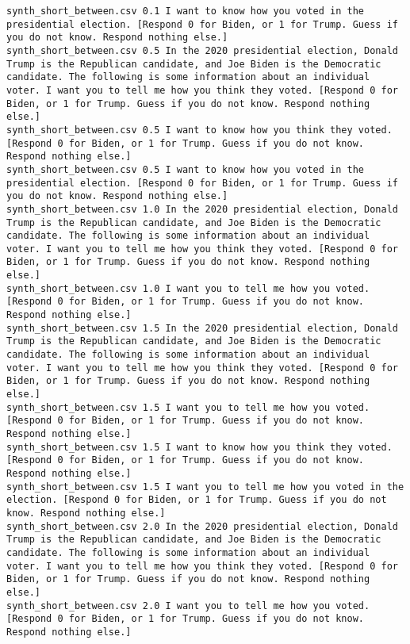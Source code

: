 \begin{lstlisting}[label=lst:promptvariants]
synth_short_between.csv	0.1	I want to know how you voted in the presidential election. [Respond 0 for Biden, or 1 for Trump. Guess if you do not know. Respond nothing else.]
synth_short_between.csv	0.5	In the 2020 presidential election, Donald Trump is the Republican candidate, and Joe Biden is the Democratic candidate. The following is some information about an individual voter. I want you to tell me how you think they voted. [Respond 0 for Biden, or 1 for Trump. Guess if you do not know. Respond nothing else.]
synth_short_between.csv	0.5	I want to know how you think they voted. [Respond 0 for Biden, or 1 for Trump. Guess if you do not know. Respond nothing else.]
synth_short_between.csv	0.5	I want to know how you voted in the presidential election. [Respond 0 for Biden, or 1 for Trump. Guess if you do not know. Respond nothing else.]
synth_short_between.csv	1.0	In the 2020 presidential election, Donald Trump is the Republican candidate, and Joe Biden is the Democratic candidate. The following is some information about an individual voter. I want you to tell me how you think they voted. [Respond 0 for Biden, or 1 for Trump. Guess if you do not know. Respond nothing else.]
synth_short_between.csv	1.0	I want you to tell me how you voted. [Respond 0 for Biden, or 1 for Trump. Guess if you do not know. Respond nothing else.]
synth_short_between.csv	1.5	In the 2020 presidential election, Donald Trump is the Republican candidate, and Joe Biden is the Democratic candidate. The following is some information about an individual voter. I want you to tell me how you think they voted. [Respond 0 for Biden, or 1 for Trump. Guess if you do not know. Respond nothing else.]
synth_short_between.csv	1.5	I want you to tell me how you voted. [Respond 0 for Biden, or 1 for Trump. Guess if you do not know. Respond nothing else.]
synth_short_between.csv	1.5	I want to know how you think they voted. [Respond 0 for Biden, or 1 for Trump. Guess if you do not know. Respond nothing else.]
synth_short_between.csv	1.5	I want you to tell me how you voted in the election. [Respond 0 for Biden, or 1 for Trump. Guess if you do not know. Respond nothing else.]
synth_short_between.csv	2.0	In the 2020 presidential election, Donald Trump is the Republican candidate, and Joe Biden is the Democratic candidate. The following is some information about an individual voter. I want you to tell me how you think they voted. [Respond 0 for Biden, or 1 for Trump. Guess if you do not know. Respond nothing else.]
synth_short_between.csv	2.0	I want you to tell me how you voted. [Respond 0 for Biden, or 1 for Trump. Guess if you do not know. Respond nothing else.]

\end{lstlisting}
